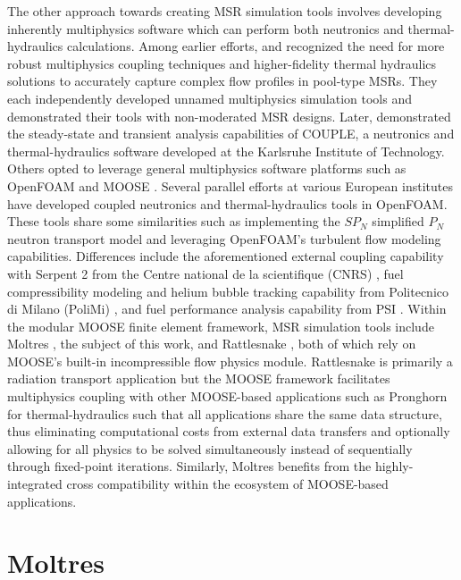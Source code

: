 The other approach towards creating \gls{MSR} simulation tools involves
developing inherently multiphysics software which can perform both
neutronics and thermal-hydraulics calculations. Among earlier efforts,
\cite{nicolino_coupled_2008} and \cite{zhang_development_2009} recognized the
need for more robust multiphysics coupling techniques and higher-fidelity
thermal hydraulics solutions to accurately capture complex flow profiles in
pool-type \glspl{MSR}. They each independently developed unnamed multiphysics
simulation tools and demonstrated their tools with non-moderated \gls{MSR}
designs. Later, \cite{li_transient_2015} demonstrated the steady-state and
transient analysis capabilities of COUPLE, a neutronics and thermal-hydraulics
software developed at the Karlsruhe Institute of Technology.  Others opted to
leverage general multiphysics software platforms such as OpenFOAM
\citep{openfoam_openfoam_2021} and \gls{MOOSE}
\citep{gaston_physics-based_2015}.
Several parallel efforts at various European institutes have developed coupled
neutronics and thermal-hydraulics tools in OpenFOAM. These tools share some
similarities such as implementing the $SP_N$ simplified $P_N$ neutron transport
model and leveraging OpenFOAM's turbulent flow modeling capabilities.
Differences include the aforementioned external coupling capability with
Serpent 2 from the Centre national de la scientifique (CNRS)
\citep{blanco_neutronic_2020}, fuel compressibility modeling and helium bubble
tracking capability from Politecnico di Milano (PoliMi)
\citep{cervi_development_2019}, and fuel performance analysis capability from
PSI \citep{fiorina_creation_2018}. Within the modular MOOSE finite element
framework, \gls{MSR} simulation tools include Moltres
\citep{lindsay_introduction_2018}, the subject of this work, and Rattlesnake
\citep{wang_rattlesnake_2021}, both of which rely on MOOSE's built-in
incompressible flow physics module. Rattlesnake is primarily a radiation
transport application but the MOOSE framework facilitates multiphysics coupling
with other MOOSE-based applications such as Pronghorn for thermal-hydraulics
such that all applications share the same data structure, thus eliminating
computational costs from external data transfers and optionally allowing for
all physics to be solved simultaneously instead of sequentially through
fixed-point iterations. Similarly, Moltres benefits from the highly-integrated
cross compatibility within the ecosystem of MOOSE-based applications.



\section{Moltres}
